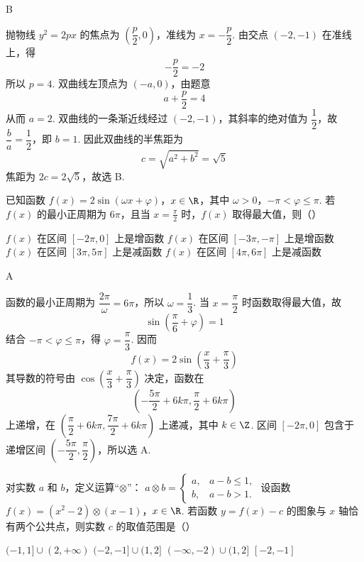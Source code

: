\begin{answer}
B
\end{answer}

\begin{solution}
抛物线 \(y^2=2px\) 的焦点为 \(\left(\dfrac p2,0\right)\)，准线为 \(x=-\dfrac p2\). 由交点 \((-2,-1)\) 在准线上，得
\[
-\frac p2=-2
\]
所以 \(p=4\). 双曲线左顶点为 \((-a,0)\)，由题意
\[
a+\frac p2=4
\]
从而 \(a=2\). 双曲线的一条渐近线经过 \((-2,-1)\)，其斜率的绝对值为 \(\dfrac{1}{2}\)，故 \(\dfrac ba=\dfrac12\)，即 \(b=1\). 因此双曲线的半焦距为
\[
c=\sqrt{a^2+b^2}=\sqrt5
\]
焦距为 \(2c=2\sqrt5\)，故选 B.
\end{solution}

\begin{problem}
已知函数 \(f(x) = 2\sin (\omega x + \varphi)\)，\(x \in \R\)，其中 \(\omega > 0\)，\(-\pi < \varphi \leqslant \pi\). 若 \( f(x) \) 的最小正周期为 \( 6\pi \)，且当 \( x = \frac{\pi}{2} \) 时，\( f(x) \) 取得最大值，则（\quad）

\choices
    {\(f(x)\) 在区间 \([-2\pi, 0]\) 上是增函数}
    {\(f(x)\) 在区间 \([-3\pi, -\pi]\) 上是增函数}
    {\(f(x)\) 在区间 \([3\pi, 5\pi]\) 上是减函数}
    {\(f(x)\) 在区间 \([4\pi, 6\pi]\) 上是减函数}
\end{problem}

\begin{answer}
A
\end{answer}

\begin{solution}
函数的最小正周期为 \(\dfrac{2\pi}{\omega}=6\pi\)，所以 \(\omega=\dfrac13\). 当 \(x=\dfrac\pi2\) 时函数取得最大值，故
\[
\sin\left(\frac\pi6+\varphi\right)=1
\]
结合 \(-\pi<\varphi\leqslant\pi\)，得 \(\varphi=\dfrac\pi3\). 因而
\[
f(x)=2\sin\left(\frac x3+\frac\pi3\right)
\]
其导数的符号由 \(\cos\left(\dfrac x3+\dfrac\pi3\right)\) 决定，函数在
\[
\left(-\frac{5\pi}{2}+6k\pi,\frac\pi2+6k\pi\right)
\]
上递增，在 \(\left(\dfrac\pi2+6k\pi,\dfrac{7\pi}{2}+6k\pi\right)\) 上递减，其中 \(k\in\Z\). 区间 \([-2\pi,0]\) 包含于递增区间 \(\left(-\dfrac{5\pi}{2},\dfrac\pi2\right)\)，所以选 A.
\end{solution}

\begin{problem}
对实数 \(a\) 和 \(b\)，定义运算“\(\otimes\)”： \( a \otimes b = \begin{cases}
a, & a - b \leqslant 1,\\
b, & a - b > 1.
\end{cases} \) 设函数 \(f(x) = (x^{2} - 2) \otimes (x - 1)\)，\(x \in \R\). 若函数 \( y = f(x) - c \) 的图象与 \(x\) 轴恰有两个公共点，则实数 \(c\) 的取值范围是（\quad）

\choices
    {\((-1,1]\cup (2, + \infty)\)}
    {\((-2, - 1] \cup (1, 2]\)}
    {\((-\infty, -2) \cup (1, 2]\)}
    {\([-2, - 1]\)}
\end{problem}

